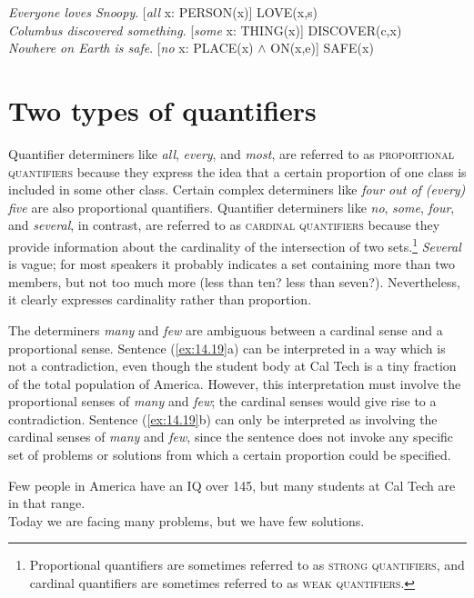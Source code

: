 \ea \label{ex:14.18}
\ea \textit{Everyone loves Snoopy}.         \hfill  [\textit{all} x: PERSON(x)] LOVE(x,s)\\
\ex \textit{Columbus discovered something}. \hfill [\textit{some} x: THING(x)] DISCOVER(c,x)\\
\ex \textit{Nowhere on Earth is safe}.      \hfill [\textit{no} x: PLACE(x) $\wedge$ ON(x,e)] SAFE(x)
                       \z
\z

\section{Two types of quantifiers}\label{sec:14.4}

Quantifier determiners like \textit{all}, \textit{every}, and \textit{most}, are referred to as \textsc{proportional quantifiers} because they express the idea that a certain proportion of one class is included in some other class. Certain complex determiners like \textit{four out of (every) five} are also proportional quantifiers. Quantifier determiners like \textit{no}, \textit{some}, \textit{four}, and \textit{several}, in contrast, are referred to as \textsc{cardinal quantifiers} because they provide information about the cardinality of the intersection of two sets.\footnote{Proportional quantifiers are sometimes referred to as \textsc{strong} \textsc{quantifiers}, and cardinal quantifiers are sometimes referred to as \textsc{weak} \textsc{quantifiers}.} \textit{Several} is vague; for most speakers it probably indicates a set containing more than two members, but not too much more (less than ten? less than seven?). Nevertheless, it clearly expresses cardinality rather than proportion.



The determiners \textit{many} and \textit{few} are ambiguous between a cardinal sense and a proportional sense. Sentence (\ref{ex:14.19}a) can be interpreted in a way which is not a contradiction, even though the student body at Cal Tech is a tiny fraction of the total population of America. However, this interpretation must involve the proportional senses of \textit{many} and \textit{few}; the cardinal senses would give rise to a contradiction. Sentence (\ref{ex:14.19}b) can only be interpreted as involving the cardinal senses of \textit{many} and \textit{few}, since the sentence does not invoke any specific set of problems or solutions from which a certain proportion could be specified.


\ea \label{ex:14.19}
\ea Few people in America have an IQ over 145, but many students at Cal Tech are in that range.\\
\ex Today we are facing many problems, but we have few solutions.
                       \z
\z


